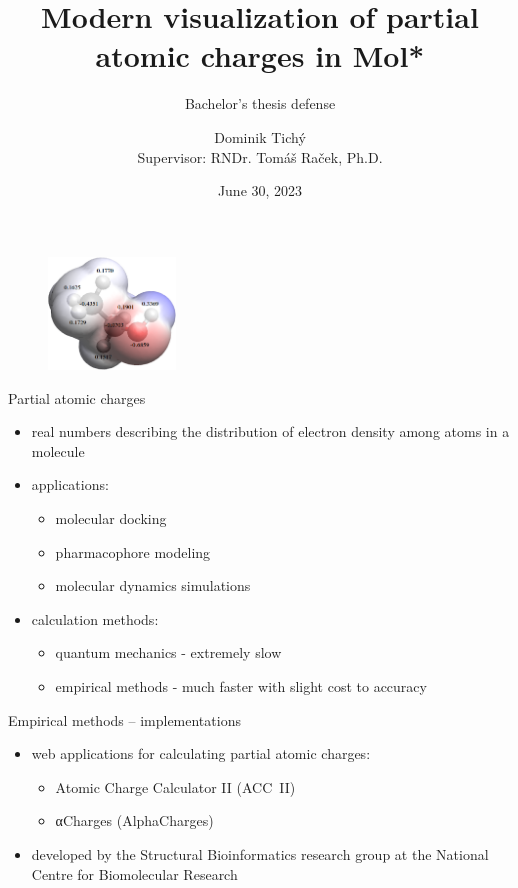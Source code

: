 \documentclass[
]{beamer}
\title[Visualization of partial charges in Mol*]{Modern visualization of partial atomic charges in Mol*}
\subtitle[Short Presentation Subtitle]{Bachelor's thesis defense}
\author[D. Tichý]{Dominik Tichý\texorpdfstring{\\}{, }Supervisor: RNDr. Tomáš Raček, Ph.D.}
\institute[FI MU]{Faculty of Informatics, Masaryk University}
\date{June 30, 2023}
\begin{document}
\begin{frame}[plain]
  \maketitle
\end{frame}

\begin{figure}
  \vspace{55pt}
  \hspace{45pt}
  \includegraphics[height=3cm]{images/charges-numbers.png}
\end{figure}

\begin{frame}{Partial atomic charges}
  \begin{itemize}
    \item real numbers describing the distribution of electron density among atoms in a molecule
    \item applications:
    \begin{itemize}
      \item molecular docking
      \item pharmacophore modeling
      \item molecular dynamics simulations
    \end{itemize}
      \item calculation methods:
    \begin{itemize}
      \item quantum mechanics - extremely slow
      \item empirical methods - much faster with slight cost to accuracy
    \end{itemize}
  \end{itemize}
\end{frame}

\begin{frame}{Empirical methods -- implementations}
  \begin{itemize}
    \item web applications for calculating partial atomic charges:
    \begin{itemize}
      \item Atomic Charge Calculator II (ACC~II) 
      \item αCharges (AlphaCharges) 
    \end{itemize}
    \item developed by the Structural Bioinformatics research group at the National Centre for Biomolecular Research 
  \end{itemize}
\end{frame}
\end{document}
